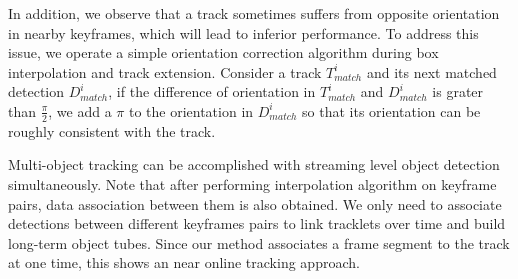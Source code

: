 \documentclass[letterpaper, 10pt, conference]{ieeeconf}  %
\def\figurename{\emph{Figure}}
\begin{document}
In addition, we observe that a track sometimes suffers from opposite orientation in nearby keyframes, which will lead to inferior performance. To address this issue, we operate a simple orientation correction algorithm during box interpolation and track extension. Consider a track $T^i_{match}$ and its next matched detection $D^i_{match}$, if the difference of orientation in $T^i_{match}$ and $D^i_{match}$ is grater than $\frac{\pi}{2}$, we add a $\pi$ to the orientation in $D^i_{match}$ so that its orientation can be roughly consistent with the track. 

Multi-object tracking can be accomplished with streaming level object detection simultaneously. Note that after performing interpolation algorithm on keyframe pairs, data association between them is also obtained. We only need to associate detections between different keyframes pairs to link tracklets over time and build long-term object tubes. Since our method associates a frame segment to the track at one time, this shows an near online tracking approach.

\end{document}
